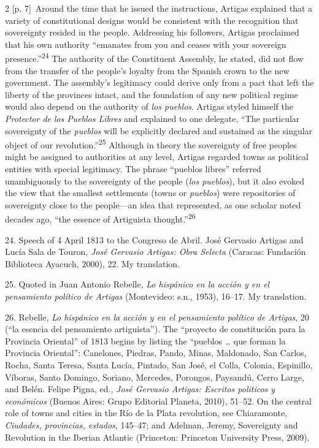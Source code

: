 \documentclass[10pt,a4paper]{article}
\begin{document}
\begin{paracol}{2}
{\scriptsize\color{gray} [p. 7]}\ Around the time that he issued the instructions, Artigas explained that a variety of constitutional designs would be consistent with the recognition that sovereignty resided in the people. Addressing his followers, Artigas proclaimed that his own authority “emanates from you and ceases with your sovereign presence.”\nobreak\textsuperscript{24} The authority of the Constituent Assembly, he stated, did not flow from the transfer of the people’s loyalty from the Spanish crown to the new government. The assembly’s legitimacy could derive only from a pact that left the liberty of the provinces intact, and the foundation of any new political regime would also depend on the authority of \textit{los pueblos}. Artigas styled himself the \textit{Protector de} \textit{los Pueblos Libres} and explained to one delegate, “The particular sovereignty of the \textit{pueblos} will be explicitly declared and sustained as the singular object of our revolution.”\nobreak\textsuperscript{25} Although in theory the sovereignty of free peoples might be assigned to authorities at any level, Artigas regarded towns as political entities with special legitimacy. The phrase “pueblos libres” referred unambiguously to the sovereignty of the people (\textit{los pueblos}), but it also evoked the view that the smallest settlements (towns or \textit{pueblos}) were repositories of sovereignty close to the people—an idea that represented, as one scholar noted decades ago, “the essence of Artiguista thought.”\nobreak\textsuperscript{26}\par{\small 24. Speech of 4 April 1813 to the Congreso de Abril. José Gervasio Artigas and Lucía Sala de Touron, \textit{José Gervasio Artigas: Obra Selecta} (Caracas: Fundación Biblioteca Ayacuch, 2000), 22. My translation.\par}{\small 25. Quoted in Juan Antonio Rebelle, \textit{Lo hispánico en la acción y en el pensamiento político de Artigas} (Montevideo: s.n., 1953), 16–17. My translation.\par}{\small 26. Rebelle, \textit{Lo hispánico en la acción y en el pensamiento político de Artigas}, 20 (“la esencia del pensamiento artiguista”). The “proyecto de constitución para la Provincia Oriental” of 1813 begins by listing the “pueblos … que forman la Provincia Oriental”: Canelones, Piedras, Pando, Minas, Maldonado, San Carlos, Rocha, Santa Teresa, Santa Lucía, Pintado, San José, el Colla, Colonia, Espinillo, Víboras, Santo Domingo, Soriano, Mercedes, Porongos, Paysandú, Cerro Large, and Belén. Felipe Pigna, ed., \textit{José Gervasio Artigas: Escritos politicos y económicos} (Buenos Aires: Grupo Editorial Planeta, 2010), 51–52. On the central role of towns and cities in the Río de la Plata revolution, see Chiaramonte, \textit{Ciudades, provincias, estados}, 145–47; and Adelman, Jeremy, Sovereignty and Revolution in the Iberian Atlantic (Princeton: Princeton University Press, 2009).\par}

\end{paracol}
\end{document}
